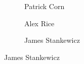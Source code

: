 \begin{frame}[plain]
\begin{figure}[h]
\begin{subfigure}{0.23\textwidth}
	\caption{Patrick Corn}
	\end{subfigure}
	\begin{subfigure}{0.23\textwidth}
	\captionsetup{labelformat=empty}
	\centering
	\caption{Alex Rice}
	\end{subfigure}
	\begin{subfigure}{0.25\textwidth}
	\captionsetup{labelformat=empty}
	\centering
	\caption{James Stankewicz}
	\end{subfigure}
	\end{figure}
\end{frame}



